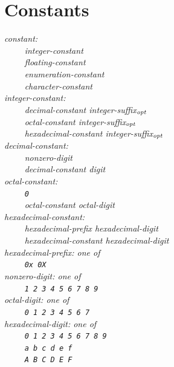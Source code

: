 \documentclass[12pt]{report}
\def\|{\verb|}
\newcommand\opt{$_{{\it opt}}$ }
\begin{document}
\rm
\section{Constants}
\it
\noindent
constant:\\
\|    | integer-constant\\
\|    | floating-constant\\
\|    | enumeration-constant\\
\|    | character-constant\\

\noindent
integer-constant:\\
\|    | decimal-constant integer-suffix\opt\\
\|    | octal-constant integer-suffix\opt\\
\|    | hexadecimal-constant integer-suffix\opt\\

\noindent
decimal-constant:\\
\|    | nonzero-digit\\
\|    | decimal-constant digit\\

\noindent
octal-constant:\\
\|    | \verb+0+\\
\|    | octal-constant octal-digit\\

\noindent
hexadecimal-constant:\\
\|    | hexadecimal-prefix hexadecimal-digit\\
\|    | hexadecimal-constant hexadecimal-digit\\

\noindent
hexadecimal-prefix: {\rm one of}\\
\|    | \verb+0x 0X+\\

\noindent
nonzero-digit: {\rm one of}\\
\|    | \verb+1 2 3 4 5 6 7 8 9+\\

\noindent
octal-digit: {\rm one of}\\
\|    | \verb+0 1 2 3 4 5 6 7+\\

\noindent
hexadecimal-digit: {\rm one of}\\
\|    | \verb+0 1 2 3 4 5 6 7 8 9+\\
\|    | \verb+a b c d e f+\\
\|    | \verb+A B C D E F+\\
\end{document}
